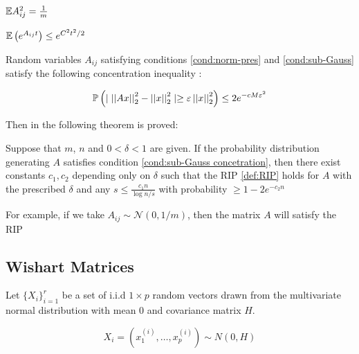 \documentclass[12pt]{report}
\begin{document}
\begin{condition}
\({\mathbb{E}} A_{ij}^2 = \frac{1}{m}\)
\label{cond:norm-pres}
\end{condition}

\begin{condition}
\({\mathbb{E}}\left( e^{A_{ij}t} \right) \leq e^{C^2 t^2 /2}\)
\label{cond:sub-Gauss}
\end{condition}

Random variables \(A_{ij}\) satisfying conditions \eqref{cond:norm-pres} and \eqref{cond:sub-Gauss} satisfy the following concentration inequality \cite{baraniuk2008simple}:

\begin{lemma}
\begin{equation}
{\mathbb{P}}\left( \mid \left|\left|Ax\right|\right|_2^2 - \left|\left|x\right|\right|_2^2 \mid \geq \varepsilon  \left|\left|x\right|\right|_2^2 \right) \leq 2e^{-cM\varepsilon^2}
\label{cond:sub-Gauss concetration}
\end{equation} 
\end{lemma}

Then in \cite{baraniuk2008simple} the following theorem is proved:

\begin{theorem}
Suppose that \(m\), \(n\) and \(0 < \delta < 1\) are given. If the probability distribution generating \(A\) satisfies condition \eqref{cond:sub-Gauss concetration}, then there exist constants \(c_1, c_2\) depending only on \(\delta\) such that the RIP \eqref{def:RIP} holds for \(A\) with the prescribed \(\delta\) and any  \(s \leq \frac{c_1 n}{\log{n/s}}\) with probability \(\geq 1-2e^{-c_2n}\) 
\end{theorem}

For example, if we take \(A_{ij} \sim \mathcal{N}\left(0, 1/m\right)\), then the matrix \(A\) will satisfy the RIP 

\subsection{Wishart Matrices}

Let \(\{X_i\}_{i=1}^r\) be a set of i.i.d \(1 \times p\) random vectors drawn from the multivariate normal distribution with mean 0 and covariance matrix \(H\).

\begin{equation}
X_i = \left(x_1^{(i)}, \ldots , x_p^{(i)}\right) \sim N\left(0, H\right)
\end{equation}
\end{document}
